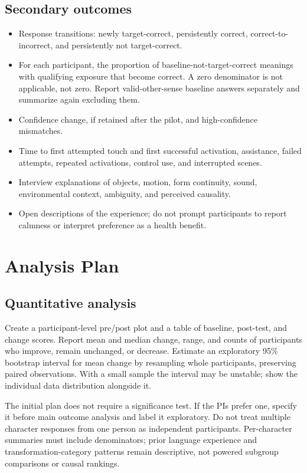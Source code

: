 \documentclass[11pt,letterpaper]{article}
\begin{document}
\subsection{Secondary outcomes}
\begin{itemize}
\item Response transitions: newly target-correct, persistently correct, correct-to-incorrect, and persistently not target-correct.
\item For each participant, the proportion of baseline-not-target-correct meanings with qualifying exposure that become correct. A zero denominator is not applicable, not zero. Report valid-other-sense baseline answers separately and summarize again excluding them.
\item Confidence change, if retained after the pilot, and high-confidence mismatches.
\item Time to first attempted touch and first successful activation, assistance, failed attempts, repeated activations, control use, and interrupted scenes.
\item Interview explanations of objects, motion, form continuity, sound, environmental context, ambiguity, and perceived causality.
\item Open descriptions of the experience; do not prompt participants to report calmness or interpret preference as a health benefit.
\end{itemize}

\section{Analysis Plan}
\subsection{Quantitative analysis}
Create a participant-level pre/post plot and a table of baseline, post-test, and change scores. Report mean and median change, range, and counts of participants who improve, remain unchanged, or decrease. Estimate an exploratory 95\% bootstrap interval for mean change by resampling whole participants, preserving paired observations. With a small sample the interval may be unstable; show the individual data distribution alongside it.

The initial plan does not require a significance test. If the PIs prefer one, specify it before main outcome analysis and label it exploratory. Do not treat multiple character responses from one person as independent participants. Per-character summaries must include denominators; prior language experience and transformation-category patterns remain descriptive, not powered subgroup comparisons or causal rankings.
\end{document}
